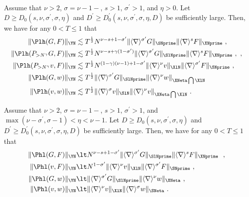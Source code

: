 \documentclass[11pt]{article}
\begin{document}
\begin{lem}\label{nl:lem_low_high}
Assume that \( \nu> 2 \), \( \sigma=\nu-1- \), \( s> 1 \), \( \sigma^\prime > 1 \), and \( \eta >0  \). Let \( D\geq D_0(s,\nu,\sigma^\prime,\sigma,\eta) \) and \( D^\prime\geq D_0^\prime(s,\nu,\sigma^\prime,\sigma,\eta,D) \) be sufficiently large. Then, we have for any \( 0 < T \leq 1 \) that  
\begin{align}
\|  \Plh(G,F) \|_{\YN}  &\lesssim T^{\frac{1}{2}} N^{\nu-s+1-\sigma^\prime} \| \langle \nabla \rangle^{\sigma^\prime} G \|_{\SNprime} \| \langle \nabla \rangle^s F \|_{\XNprime}~, \label{nl:eq_low_high_FF}\\
\|  \Plh(P_{>N^\gamma} G,F) \|_{\YN} &\lesssim T^{\frac{1}{2}} N^{\nu-s+\gamma(1-\sigma^\prime)} \| \langle \nabla \rangle^{\sigma^\prime} G \|_{\SlNprime} \| \langle \nabla \rangle^s F \|_{\XNprime}~, \label{nl:eq_low_high_PFF}~,\\
\| \Plh(P_{>N^\gamma} v , F) \|_{\YN} & \lesssim T^{\frac{1}{2}} N^{(1-\gamma)(\nu-1)+1-\sigma^\prime} \| \langle \nabla \rangle^{\nu} v \|_{\XlN} \| \langle \nabla \rangle^{\sigma^\prime} F \|_{\SNprime} \label{nl:eq_low_high_PwF}~, \\
\| \Plh(G,w) \|_{\YN} &\lesssim  T^{\frac{1}{2}} \| \langle \nabla \rangle^{\sigma^\prime} G \|_{\SlNprime} \| \langle \nabla \rangle^{\nu} w \|_{\XNeta \bigcap \XlN} \label{nl:eq_low_high_Fw}\\
\| \Plh(v,w) \|_{\YN} &\lesssim T^{\frac{1}{2}} \| \langle \nabla \rangle^{\sigma} v\|_{\SlN} \| \langle \nabla \rangle^{\nu} v \|_{\XNeta \bigcap \XlN}~. \label{nl:eq_low_high_ww}
\end{align}
\end{lem}

\begin{lem}\label{nl:lem_high_low}
Assume that \( \nu> 2 \), \( \sigma=\nu-1- \), \( s> 1 \), \( \sigma^\prime > 1 \), and \( \max( \nu-\sigma^\prime, \sigma-1 ) < \eta < \nu - 1 \). Let \( D\geq D_0(s,\nu,\sigma^\prime,\sigma,\eta) \) and \( D^\prime\geq D_0^\prime(s,\nu,\sigma^\prime,\sigma,\eta,D) \) be sufficiently large. Then, we have for any \( 0 < T \leq 1 \) that  
\begin{align}
\| \Phl(G,F) \|_{\YN} &\lt N^{\nu-s+1-\sigma^\prime} \|\langle \nabla \rangle^{\sigma^\prime} G \|_{\SlNprime} \| \langle \nabla \rangle^s F\|_{\XNprime}~\label{nl:eq_high_low_FF}~, \\
\| \Phl(v,F) \|_{\YN} &\lt N^{1-\sigma^\prime} \| \langle \nabla \rangle^{\nu} v \|_{\XlN} \| \langle \nabla \rangle^{\sigma^\prime} F \|_{\SNprime} \label{nl:eq_high_low_wF}~,\\
\| \Phl(G,w) \|_{\YN} &\lt  \| \langle \nabla \rangle^{\sigma^\prime} G \|_{\SlNprime} \| \langle \nabla \rangle^\nu w \|_{\XNeta}~, \label{nl:eq_high_low_Fw}\\
\| \Phl(v,w) \|_{\YN} &\lt \| \langle \nabla \rangle^{\nu}  v \|_{\XlN} \| \langle \nabla \rangle^{\sigma} w \|_{\SNeta}~. \label{nl:eq_high_low_ww}
\end{align}
\end{lem}
\end{document}
